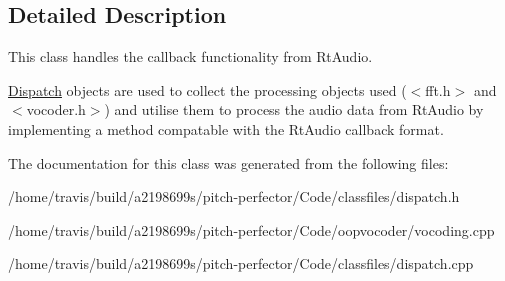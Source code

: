 \subsection{Detailed Description}
This class handles the callback functionality from Rt\-Audio. 

\hyperlink{classDispatch}{Dispatch} objects are used to collect the processing objects used ($<$fft.\-h$>$ and $<$vocoder.\-h$>$) and utilise them to process the audio data from Rt\-Audio by implementing a method compatable with the Rt\-Audio callback format. 

The documentation for this class was generated from the following files\-:\begin{DoxyCompactItemize}
\item 
/home/travis/build/a2198699s/pitch-\/perfector/\-Code/classfiles/dispatch.\-h\item 
/home/travis/build/a2198699s/pitch-\/perfector/\-Code/oopvocoder/vocoding.\-cpp\item 
/home/travis/build/a2198699s/pitch-\/perfector/\-Code/classfiles/dispatch.\-cpp\end{DoxyCompactItemize}
